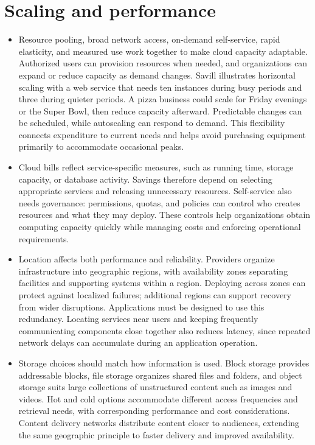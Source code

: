 \documentclass[10pt]{article}
\begin{document}
\section*{Scaling and performance}

\begin{itemize}[leftmargin=1.25em, itemsep=0.3em, parsep=0pt, topsep=0pt]
    \item Resource pooling, broad network access, on-demand self-service, rapid elasticity, and measured use work together to make cloud capacity adaptable. Authorized users can provision resources when needed, and organizations can expand or reduce capacity as demand changes. Savill illustrates horizontal scaling with a web service that needs ten instances during busy periods and three during quieter periods. A pizza business could scale for Friday evenings or the Super Bowl, then reduce capacity afterward. Predictable changes can be scheduled, while autoscaling can respond to demand. This flexibility connects expenditure to current needs and helps avoid purchasing equipment primarily to accommodate occasional peaks.

    \item Cloud bills reflect service-specific measures, such as running time, storage capacity, or database activity. Savings therefore depend on selecting appropriate services and releasing unnecessary resources. Self-service also needs governance: permissions, quotas, and policies can control who creates resources and what they may deploy. These controls help organizations obtain computing capacity quickly while managing costs and enforcing operational requirements.

    \item Location affects both performance and reliability. Providers organize infrastructure into geographic regions, with availability zones separating facilities and supporting systems within a region. Deploying across zones can protect against localized failures; additional regions can support recovery from wider disruptions. Applications must be designed to use this redundancy. Locating services near users and keeping frequently communicating components close together also reduces latency, since repeated network delays can accumulate during an application operation.

    \item Storage choices should match how information is used. Block storage provides addressable blocks, file storage organizes shared files and folders, and object storage suits large collections of unstructured content such as images and videos. Hot and cold options accommodate different access frequencies and retrieval needs, with corresponding performance and cost considerations. Content delivery networks distribute content closer to audiences, extending the same geographic principle to faster delivery and improved availability.
\end{itemize}
\end{document}
